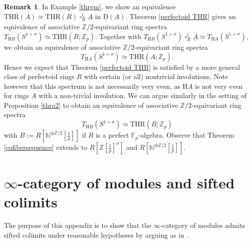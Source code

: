\documentclass[10pt]{amsart}
\theoremstyle{definition}
\newtheorem{rmk}[thm]{Remark}
\numberwithin{equation}{section}
\newcommand{\F}{\mathbb{F}}
\renewcommand{\L}{\mathbb{L}}
\newcommand{\N}{\mathbb{N}}
\newcommand{\Z}{\mathbb{Z}}
\newcommand{\rD}{\mathrm{D}}
\newcommand{\rH}{\mathrm{H}}
\newcommand{\ul}{\underline}
\DeclareMathOperator{\sotimes}{\square}
\newcommand{\THR}{\mathrm{THR}}
\begin{document}
\begin{rmk}
In Example \ref{thrgm},
we show an equivalence $\THR(A)\simeq \THR(R)\sotimes_{\ul{R}}^\L \ul{A}$ in $\rD(\ul{A})$.
Theorem \ref{perfectoid THR} gives an equivalence of associative $\Z/2$-equivariant ring spectra
\(
T_{\rH \ul{R}}(S^{1+\sigma})
\simeq
\THR(R;\Z_p).
\)
Together with
\(
T_{\rH \ul{R}}(S^{1+\sigma})
\sotimes_{\ul{R}}^\L \ul{A}
\simeq
T_{\rH \ul{A}}(S^{1+\sigma}),
\)
we obtain an equivalence of associative $\Z/2$-equivariant ring spectra
\[
T_{\rH \ul{A}}(S^{1+\sigma})
\simeq
\THR(A;\Z_p).
\]
Hence we expect that Theorem \ref{perfectoid THR} is satisfied by a more general class of perfectoid rings $R$ with certain (or all) nontrivial involutions.
Note however that this spectrum is not necessarily very even, as $\rH \ul{A}$ is not very even for rings $A$ with a non-trivial involution.
We can argue similarly in the setting of Proposition \ref{thra2} to obtain an equivalence of associative $\Z/2$-equivariant ring spectra
\[
T_{\rH \ul{B}}(S^{1+\sigma})
\simeq
\THR(B;\Z_p)
\]
with $B:=R[\N^{\oplus \Z/2}[\tfrac{1}{p}]]$ if $R$ is a perfect $\F_p$-algebra.
Observe that Theorem \ref{cofibersequence} extends to $R[\Z[\tfrac{1}{p}]^\sigma]$ and $R[\N^{\oplus \Z/2}[\tfrac{1}{p}]]$.
\end{rmk}


\appendix

\section{\texorpdfstring{$\infty$-}{Infinity }category of modules and sifted colimits}
\label{secA}

The purpose of this appendix is to show that the $\infty$-category of modules admits sifted colimits under reasonable hypotheses by arguing as in \cite[Proposition 3.2.3.1]{HA}.
\end{document}
